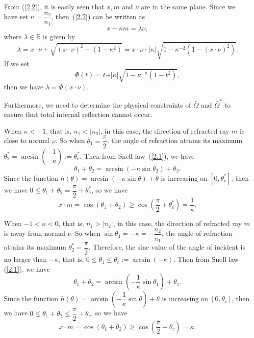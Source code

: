 \documentclass[a4paper,12pt,]{article}
\numberwithin{equation}{section}
\numberwithin{equation}{section} \allowdisplaybreaks
\begin{document}
From (\ref{2.2}), it is easily seen that $x,m$ and $\nu$ are in the same plane. Since we have set $\kappa=\dfrac{n_{2}}{n_{1}}$, 
then~(\ref{2.2}) can be written as
\begin{equation}\label{2.3}
  x-\kappa m = \lambda \nu,
\end{equation}
where $\lambda\in \mathbb{R}$ is given by
\begin{equation}\label{2.4}
  \lambda = x\cdot \nu + \sqrt{(x\cdot \nu)^{2} - (1 - \kappa^{2})} = x\cdot \nu + \vert \kappa \vert \sqrt{1 - \kappa^{-2}(1 - (x\cdot \nu)^{2})}.
\end{equation}
If we set
\begin{equation}\label{2.5}
  \Phi(t) = t + \vert \kappa \vert \sqrt{1 - \kappa^{-2}(1 - t^{2})},
\end{equation}
then we have $\lambda = \Phi (x \cdot \nu)$.

Furthermore, we need to determine the physical constraints of $\bar{\Omega}$ and $\bar{\Omega}^{\ast}$ to ensure that total internal reflection cannot occur.

When $\kappa<-1$, that is, $n_{1}<\vert n_{2} \vert$, in this case, the direction of refracted ray $m$ is close to normal $\nu$. So when $\theta_{1} = \dfrac{\pi}{2}$, the angle of refraction attains its maximum $\theta_{2}^{\ast} = \arcsin\left(-\dfrac{1}{\kappa}\right) := \theta_{c}^{\ast}$. 
Then from Snell law~(\ref{2.1}), we have
\begin{equation*}
  \theta_{1} + \theta_{2} = \arcsin(-\kappa \sin\theta_{2}) + \theta_{2}.
\end{equation*}
Since the function $h(\theta) = \arcsin(-\kappa \sin\theta) + \theta$ is increasing on $[0,\theta_{c}^{\ast}]$, then we have $0\leq \theta_{1} + \theta_{2} = \dfrac{\pi}{2} + \theta_{c}^{\ast}$, so we have
\begin{equation*}
  x \cdot m = \cos(\theta_{1} + \theta_{2}) \geq \cos\left(\dfrac{\pi}{2} + \theta_{c}^{\ast}\right) = \frac{1}{\kappa}.
\end{equation*}

When $-1<\kappa<0$, that is, $n_{1}>|n_{2}|$, in this case, the direction of refracted ray $m$ is away from normal $\nu$. So when $\sin\theta_{1} = -\kappa = -\dfrac{n_{2}}{n_{1}}$, the angle of refraction attains its maximum $\theta_{2}^{\ast} = \dfrac{\pi}{2}$. Therefore, the sine value of the angle of incident is no larger than $-\kappa$, that is, $0\leq \theta_{1} \leq \theta_{c} := \arcsin(-\kappa)$. Then from Snell law (\ref{2.1}), we have
\begin{equation*}
   \theta_{1} + \theta_{2} = \arcsin\left(-\frac{1}{\kappa}\sin\theta_{1}\right) + \theta_{1}.
\end{equation*}
Since the function $h(\theta) = \arcsin\left(-\dfrac{1}{\kappa}\sin\theta\right) + \theta$ is increasing on $[0,\theta_{c}]$, then we have $0\leq \theta_{1} + \theta_{2} \leq \dfrac{\pi}{2} + \theta_{c}$, so we have
\begin{equation*}
  x \cdot m = \cos(\theta_{1} + \theta_{2}) \geq \cos\left(\frac{\pi}{2} + \theta_{c}\right) = \kappa.
\end{equation*}
\end{document}
